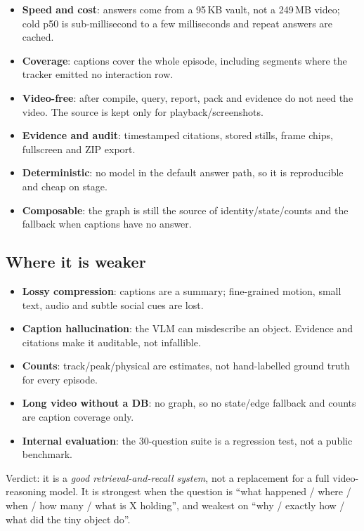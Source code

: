 \documentclass[10pt,a4paper]{article}
\begin{document}
\begin{itemize}[leftmargin=1.25em,itemsep=1pt]
  \item \textbf{Speed and cost}: answers come from a 95\,KB vault, not a 249\,MB video; cold p50 is sub-millisecond to a few milliseconds and repeat answers are cached.
  \item \textbf{Coverage}: captions cover the whole episode, including segments where the tracker emitted no interaction row.
  \item \textbf{Video-free}: after compile, query, report, pack and evidence do not need the video. The source is kept only for playback/screenshots.
  \item \textbf{Evidence and audit}: timestamped citations, stored stills, frame chips, fullscreen and ZIP export.
  \item \textbf{Deterministic}: no model in the default answer path, so it is reproducible and cheap on stage.
  \item \textbf{Composable}: the graph is still the source of identity/state/counts and the fallback when captions have no answer.
\end{itemize}

\subsection*{Where it is weaker}

\begin{itemize}[leftmargin=1.25em,itemsep=1pt]
  \item \textbf{Lossy compression}: captions are a summary; fine-grained motion, small text, audio and subtle social cues are lost.
  \item \textbf{Caption hallucination}: the VLM can misdescribe an object. Evidence and citations make it auditable, not infallible.
  \item \textbf{Counts}: track/peak/physical are estimates, not hand-labelled ground truth for every episode.
  \item \textbf{Long video without a DB}: no graph, so no state/edge fallback and counts are caption coverage only.
  \item \textbf{Internal evaluation}: the 30-question suite is a regression test, not a public benchmark.
\end{itemize}

\noindent
Verdict: it is a \emph{good retrieval-and-recall system}, not a replacement for a full video-reasoning model. It is strongest when the question is “what happened / where / when / how many / what is X holding”, and weakest on “why / exactly how / what did the tiny object do”.
\end{document}
